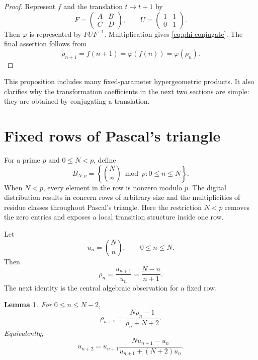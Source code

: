 \documentclass[11pt,reqno]{amsart}
\numberwithin{equation}{section}
\newtheorem{lemma}[lemma]{Lemma}
\theoremstyle{definition}
\theoremstyle{remark}
\begin{document}
\begin{proof}
Represent $f$ and the translation $t\mapsto t+1$ by
\[
  F=\begin{pmatrix}A&B\\C&D\end{pmatrix},
  \qquad
  U=\begin{pmatrix}1&1\\0&1\end{pmatrix}.
\]
Then $\varphi$ is represented by $FUF^{-1}$.  Multiplication gives \eqref{eq:phi-conjugate}.  The final assertion follows from
\[
  \rho_{n+1}=f(n+1)=\varphi(f(n))=\varphi(\rho_n).
\]
\end{proof}

This proposition includes many fixed-parameter hypergeometric products.  It also clarifies why the transformation coefficients in the next two sections are simple: they are obtained by conjugating a translation.

\section{Fixed rows of Pascal's triangle}\label{sec:binomial}

For a prime $p$ and $0\le N<p$, define
\begin{equation}\label{eq:B-Np}
  B_{N,p}=\left\{\binom Nn\bmod p:0\le n\le N\right\}.
\end{equation}
When $N<p$, every element in the row is nonzero modulo $p$.  The digital distribution results in \cite{GarfieldWilf1992,BarbolosiGrabner1996,BaratGrabner2001} concern rows of arbitrary size and the multiplicities of residue classes throughout Pascal's triangle.  Here the restriction $N<p$ removes the zero entries and exposes a local transition structure inside one row.

Let
\[
  u_n=\binom Nn,
  \qquad 0\le n\le N.
\]
Then
\begin{equation}\label{eq:binomial-ratio}
  \rho_n=\frac{u_{n+1}}{u_n}=\frac{N-n}{n+1}.
\end{equation}
The next identity is the central algebraic observation for a fixed row.

\begin{lemma}\label{lem:binomial-ratio}
For $0\le n\le N-2$,
\begin{equation}\label{eq:binomial-mobius}
  \rho_{n+1}=\frac{N\rho_n-1}{\rho_n+N+2}.
\end{equation}
Equivalently,
\begin{equation}\label{eq:binomial-transition}
  u_{n+2}
  =u_{n+1}\frac{Nu_{n+1}-u_n}
  {u_{n+1}+(N+2)u_n}.
\end{equation}
\end{lemma}
\end{document}

